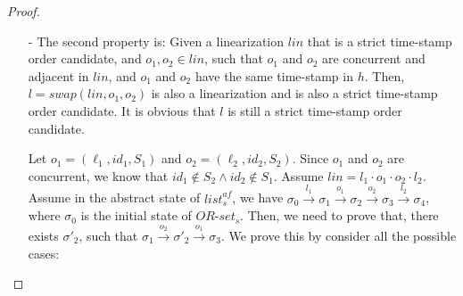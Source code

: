 {\begin {proof}
\begin{itemize}
    We prove this by contradiction. Assume $\mathit{diff}(\mathit{lin},\mathit{lin}') \neq \emptyset$, and for each $(o_1,o_2) \in \mathit{diff}(\mathit{lin},\mathit{lin}')$, we have that either $o_1$ and $o_2$ are not concurrent, or $o_1$ and $o_2$ are not adjacent in $\mathit{lin}$, or the time-stamp of $o_1$ in $h$ is different from that of $o_2$.

    By the definition of strict time-stamp order candidate, it is easy to see that if $o_1$ and $o_2$ have different time-stamp, then their order is the same between $\mathit{lin}$ and $\mathit{lin}'$. Therefore, we know that the time-stamp of $o_1$ in $h$ equals that of $o_2$.

    Since $\mathit{diff}(\mathit{lin},\mathit{lin}') \neq \emptyset$, let $(o,o')$ be a element of $\mathit{diff}(\mathit{lin},\mathit{lin}')$, and the distance of $o_1$ and $o_2$ is minimal in $\{$ the distance between $o_1$ and $o_2 \vert (o_1,o_2) \in \mathit{diff}(\mathit{lin},\mathit{lin}') \}$. Let us prove that $o$ and $o'$ are adjacent by contradiction: If there exists $o''$ between $o$ and $o'$. Assume that in $\mathit{lin}$, $o$ is before $o''$, and $o''$ is before $o'$. By assumption, the order between $o$ and $o''$, and between $o''$ and $o'$ is the same in $\mathit{lin}$ and in $\mathit{lin}'$. This implies that $o$ is still before $o'$ in $\mathit{lin}'$, which contradicts the fact that $(o,o') \in \mathit{diff}(\mathit{lin},\mathit{lin}')$.

    Since $o$ and $o'$ are adjacent and $(o,o') \in \mathit{diff}(\mathit{lin},\mathit{lin}')$, by assumption we know that $o$ and $o'$ are not concurrent. Or we can say, $(o,o') \in \mathit{vis} \vee \mathit{o',o} \in \mathit{vis}$. This contradicts that both $\mathit{lin}$ and $\mathit{lin}'$ are consistent with visibility relation. This completes the proof of the first step.

\item[-] The second property is: Given a linearization $\mathit{lin}$ that is a strict time-stamp order candidate, and $o_1,o_2 \in \mathit{lin}$, such that $o_1$ and $o_2$ are concurrent and adjacent in $\mathit{lin}$, and $o_1$ and $o_2$ have the same time-stamp in $h$. Then, $l = \mathit{swap}(\mathit{lin},o_1,o_2)$ is also a linearization and is also a strict time-stamp order candidate. It is obvious that $l$ is still a strict time-stamp order candidate.

    Let $o_1 = (\ell_1,\mathit{id}_1,S_1)$ and $o_2 = (\ell_2,\mathit{id}_2,S_2)$. Since $o_1$ and $o_2$ are concurrent, we know that $\mathit{id}_1 \notin S_2 \wedge \mathit{id}_2 \notin S_1$. Assume $\mathit{lin} = l_1 \cdot o_1 \cdot o_2 \cdot l_2$. Assume in the abstract state of $\mathit{list}_s^{\mathit{af}}$, we have $\sigma_0 {\xrightarrow{l_1}} \sigma_1 {\xrightarrow{o_1}} \sigma_2 {\xrightarrow{o_2}} \sigma_3 {\xrightarrow{l_2}} \sigma_4$, where $\sigma_0$ is the initial state of $\mathit{OR}$-$\mathit{set}_s$. Then, we need to prove that, there exists $\sigma'_2$, such that $\sigma_1 {\xrightarrow{o_2}} \sigma'_2 {\xrightarrow{o_1}} \sigma_3$. We prove this by consider all the possible cases:


\end{itemize}
\end{proof}}
